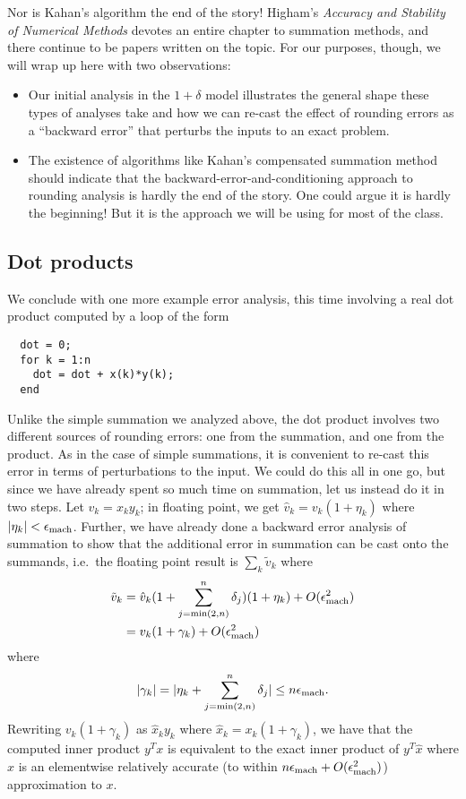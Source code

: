 \documentclass[12pt, leqno]{article} %
\begin{document}
Nor is Kahan's algorithm the end of the story!
Higham's {\em Accuracy and Stability of Numerical Methods}
devotes an entire chapter to summation methods, and there
continue to be papers written on the topic.  For our purposes,
though, we will wrap up here with two observations:
\begin{itemize}
\item Our initial analysis in the $1+\delta$ model illustrates the
  general shape these types of analyses take and how we can re-cast
  the effect of rounding errors as a ``backward error'' that perturbs
  the inputs to an exact problem.
\item The existence of algorithms like Kahan's compensated summation
  method should indicate that the backward-error-and-conditioning
  approach to rounding analysis is hardly the end of the story.
  One could argue it is hardly the beginning!  But it is the approach
  we will be using for most of the class.
\end{itemize}

\subsection{Dot products}

We conclude with one more example error analysis, this time involving
a real dot product computed by a loop of the form
\begin{lstlisting}
  dot = 0;
  for k = 1:n
    dot = dot + x(k)*y(k);
  end
\end{lstlisting}
Unlike the simple summation we analyzed above, the dot product involves
two different sources of rounding errors: one from the summation,
and one from the product.  As in the case of simple summations, it is
convenient to re-cast this error in terms of perturbations to the input.
We could do this all in one go, but since we have already spent so much
time on summation, let us instead do it in two steps.  Let $v_k = x_k y_k$;
in floating point, we get $\hat{v}_k = v_k (1+\eta_k)$
where $|\eta_k| < \epsilon_{\mathrm{mach}}$.  Further,
we have already done a backward error analysis of summation to show
that the additional error in summation can be cast onto the summands,
i.e.~the floating point result is $\sum_k \tilde{v}_k$ where
\begin{align*}
  \tilde{v}_k
  &= \hat{v}_k (1 + \sum_{j=\min(2,n)}^n \delta_j) (1 + \eta_k) + O(\epsilon_{\mathrm{mach}}^2) \\
  &= v_k (1+\gamma_k) + O(\epsilon_{\mathrm{mach}}^2)
\end{align*}
where
\[
  |\gamma_k| = |\eta_k + \sum_{j=\min(2,n)}^n \delta_j| \leq n \epsilon_{\mathrm{mach}}.
\]
Rewriting $v_k(1+\gamma_k)$ as $\hat{x}_k y_k$ where
$\hat{x}_k = x_k (1+\gamma_k)$, we have that the computed inner
product $y^T x$ is equivalent to the exact inner product of $y^T \hat{x}$
where $\hat{x}$ is an elementwise relatively accurate
(to within $n \epsilon_{\mathrm{mach}} + O(\epsilon_{\mathrm{mach}}^2)$) approximation to $x$.
\end{document}
